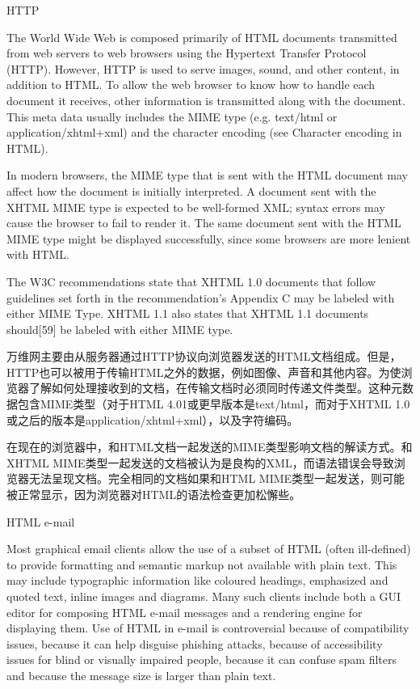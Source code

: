\begin{compactitem}
\item HTTP

The World Wide Web is composed primarily of HTML documents transmitted from web servers to web browsers using the Hypertext Transfer Protocol (HTTP). However, HTTP is used to serve images, sound, and other content, in addition to HTML. To allow the web browser to know how to handle each document it receives, other information is transmitted along with the document. This meta data usually includes the MIME type (e.g. text/html or application/xhtml+xml) and the character encoding (see Character encoding in HTML).

In modern browsers, the MIME type that is sent with the HTML document may affect how the document is initially interpreted. A document sent with the XHTML MIME type is expected to be well-formed XML; syntax errors may cause the browser to fail to render it. The same document sent with the HTML MIME type might be displayed successfully, since some browsers are more lenient with HTML.

The W3C recommendations state that XHTML 1.0 documents that follow guidelines set forth in the recommendation's Appendix C may be labeled with either MIME Type. XHTML 1.1 also states that XHTML 1.1 documents should[59] be labeled with either MIME type.

万维网主要由从服务器通过HTTP协议向浏览器发送的HTML文档组成。但是，HTTP也可以被用于传输HTML之外的数据，例如图像、声音和其他内容。为使浏览器了解如何处理接收到的文档，在传输文档时必须同时传递文件类型。这种元数据包含MIME类型（对于HTML 4.01或更早版本是text/html，而对于XHTML 1.0或之后的版本是application/xhtml+xml），以及字符编码。

在现在的浏览器中，和HTML文档一起发送的MIME类型影响文档的解读方式。和XHTML MIME类型一起发送的文档被认为是良构的XML，而语法错误会导致浏览器无法呈现文档。完全相同的文档如果和HTML MIME类型一起发送，则可能被正常显示，因为浏览器对HTML的语法检查更加松懈些。

\item HTML e-mail

Most graphical email clients allow the use of a subset of HTML (often ill-defined) to provide formatting and semantic markup not available with plain text. This may include typographic information like coloured headings, emphasized and quoted text, inline images and diagrams. Many such clients include both a GUI editor for composing HTML e-mail messages and a rendering engine for displaying them. Use of HTML in e-mail is controversial because of compatibility issues, because it can help disguise phishing attacks, because of accessibility issues for blind or visually impaired people, because it can confuse spam filters and because the message size is larger than plain text.


\end{compactitem}
